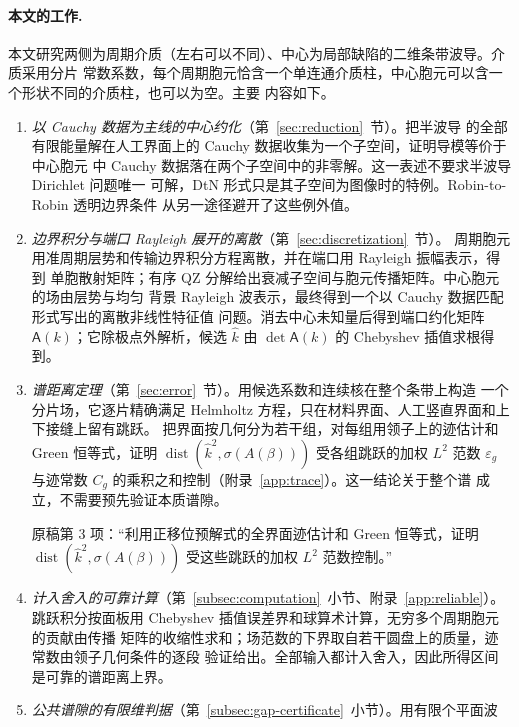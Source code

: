 \paragraph{本文的工作.}
本文研究两侧为周期介质（左右可以不同）、中心为局部缺陷的二维条带波导。介质采用分片
常数系数，每个周期胞元恰含一个单连通介质柱，中心胞元可以含一个形状不同的介质柱，也可以为空。主要
内容如下。
\begin{enumerate}
  \item \emph{以 Cauchy 数据为主线的中心约化}（第~\ref{sec:reduction}~节）。把半波导
    的全部有限能量解在人工界面上的 Cauchy 数据收集为一个子空间，证明导模等价于中心胞元
    中 Cauchy 数据落在两个子空间中的非零解。这一表述不要求半波导 Dirichlet 问题唯一
    可解，DtN 形式只是其子空间为图像时的特例。Robin-to-Robin 透明边界条件
    \cite{FlissKlindworthSchmidt2015} 从另一途径避开了这些例外值。
  \item \emph{边界积分与端口 Rayleigh 展开的离散}（第~\ref{sec:discretization}~节）。
    周期胞元用准周期层势和传输边界积分方程离散，并在端口用 Rayleigh 振幅表示，得到
    单胞散射矩阵；有序 QZ 分解给出衰减子空间与胞元传播矩阵。中心胞元的场由层势与均匀
    背景 Rayleigh 波表示，最终得到一个以 Cauchy 数据匹配形式写出的离散非线性特征值
    问题。消去中心未知量后得到端口约化矩阵 $\mathsf A(k)$；它除极点外解析，候选
    $\widehat k$ 由 $\det\mathsf A(k)$ 的 Chebyshev 插值求根得到\cite{Boyd2002,ZhaoBarnett2015}。
  \item \emph{谱距离定理}（第~\ref{sec:error}~节）。用候选系数和连续核在整个条带上构造
    一个分片场，它逐片精确满足 Helmholtz 方程，只在材料界面、人工竖直界面和上下接缝上留有跳跃。
    把界面按几何分为若干组，对每组用领子上的迹估计和 Green 恒等式，证明
    $\operatorname{dist}(\widehat k^2,\sigma(A(\beta)))$ 受各组跳跃的加权 $L^2$ 范数
    $\varepsilon_g$ 与迹常数 $C_g$ 的乘积之和控制（附录~\ref{app:trace}）。这一结论关于整个谱
    成立，不需要预先验证本质谱隙。
\begin{workonly}
原稿第 3 项：“利用正移位预解式的全界面迹估计和 Green 恒等式，证明
$\operatorname{dist}(\widehat k^2,\sigma(A(\beta)))$ 受这些跳跃的加权 $L^2$ 范数控制。”
\end{workonly}
  \item \emph{计入舍入的可靠计算}（第~\ref{subsec:computation}~小节、附录~\ref{app:reliable}）。
    跳跃积分按面板用 Chebyshev 插值误差界和球算术计算，无穷多个周期胞元的贡献由传播
    矩阵的收缩性求和；场范数的下界取自若干圆盘上的质量，迹常数由领子几何条件的逐段
    验证给出。全部输入都计入舍入，因此所得区间是可靠的谱距离上界。
  \item \emph{公共谱隙的有限维判据}（第~\ref{subsec:gap-certificate}~小节）。用有限个平面波

\end{enumerate}
